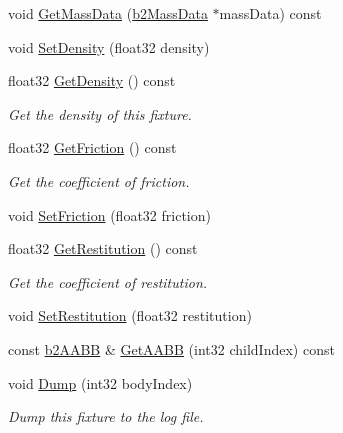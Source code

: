 \begin{DoxyCompactItemize}
\item 
void \mbox{\hyperlink{classb2Fixture_a4532a12e848c5ceb5a3b94cf45b7cbad}{Get\+Mass\+Data}} (\mbox{\hyperlink{structb2MassData}{b2\+Mass\+Data}} $\ast$mass\+Data) const
\item 
void \mbox{\hyperlink{classb2Fixture_ad4e1d9323103975c8931d022b952d04a}{Set\+Density}} (float32 density)
\item 
\mbox{\label{classb2Fixture_a228861bb1b1d7b2fb6e091401340784e}} 
float32 \mbox{\hyperlink{classb2Fixture_a228861bb1b1d7b2fb6e091401340784e}{Get\+Density}} () const
\begin{DoxyCompactList}\small\item\em Get the density of this fixture. \end{DoxyCompactList}\item 
\mbox{\label{classb2Fixture_a2853d799f299cb1ce76e48261d42a5ad}} 
float32 \mbox{\hyperlink{classb2Fixture_a2853d799f299cb1ce76e48261d42a5ad}{Get\+Friction}} () const
\begin{DoxyCompactList}\small\item\em Get the coefficient of friction. \end{DoxyCompactList}\item 
void \mbox{\hyperlink{classb2Fixture_ad0cd91eef5858c8ef1d6b62cc2a34ea2}{Set\+Friction}} (float32 friction)
\item 
\mbox{\label{classb2Fixture_ac30becb6f936a9cc825952ca2b40aa14}} 
float32 \mbox{\hyperlink{classb2Fixture_ac30becb6f936a9cc825952ca2b40aa14}{Get\+Restitution}} () const
\begin{DoxyCompactList}\small\item\em Get the coefficient of restitution. \end{DoxyCompactList}\item 
void \mbox{\hyperlink{classb2Fixture_a19c507332e4f7bd04a05f00426f11ee4}{Set\+Restitution}} (float32 restitution)
\item 
const \mbox{\hyperlink{structb2AABB}{b2\+A\+A\+BB}} \& \mbox{\hyperlink{classb2Fixture_a158574dc389fec83a05b09ab715c4474}{Get\+A\+A\+BB}} (int32 child\+Index) const
\item 
\mbox{\label{classb2Fixture_a57485e73a2063060e320c7176676cd5e}} 
void \mbox{\hyperlink{classb2Fixture_a57485e73a2063060e320c7176676cd5e}{Dump}} (int32 body\+Index)
\begin{DoxyCompactList}\small\item\em Dump this fixture to the log file. \end{DoxyCompactList}\end{DoxyCompactItemize}
